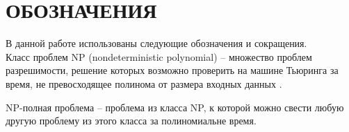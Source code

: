 \chapter*{ОБОЗНАЧЕНИЯ}

В данной работе использованы следующие обозначения и сокращения.\\

Класс проблем NP (nondeterministic polynomial) -- множество проблем разрешимости, решение которых возможно проверить на машине Тьюринга за время, не превосходящее полинома от размера входных данных .

NP-полная проблема -- проблема из класса NP, к которой можно свести любую другую проблему из этого класса за полиномиальне время.
